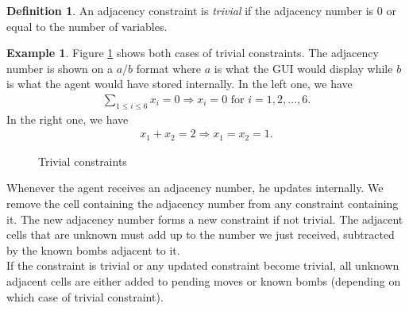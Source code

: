 \documentclass[11pt,a4paper,notitlepage]{article}
\theoremstyle{definition}
\newtheorem{example}{Example}[section]
\newtheorem{definition}{Definition}[section]
\begin{document}
\begin{definition}
An adjacency constraint is \emph{trivial} if the adjacency number is 0 or equal to the number of variables.
\end{definition}

\begin{example}
Figure \ref{fig:triv} shows both cases of trivial constraints. The adjacency number is shown on a $a/b$ format where $a$ is what the GUI would display while $b$ is what the agent would have stored internally. In the left one, we have 
\begin{align*}
\sum_{1 \leq i \leq 6}x_i = 0 \Rightarrow x_i = 0 \text{ for } i = 1,2,\ldots,6.
\end{align*}
In the right one, we have
\begin{align*}
x_1 + x_2 = 2 \Rightarrow x_1 = x_2 = 1.
\end{align*}
\begin{figure}[H]
\begin{center}
\hspace{2cm}
\end{center}
\caption{Trivial constraints}
\label{fig:triv}
\end{figure}
\end{example}

Whenever the agent receives an adjacency number, he updates internally. We remove the cell containing the adjacency number from any constraint containing it. The new adjacency number forms a new constraint if not trivial. The adjacent cells that are unknown must add up to the number we just received, subtracted by the known bombs adjacent to it.\\

If the constraint is trivial or any updated constraint become trivial, all unknown adjacent cells are either added to pending moves or known bombs (depending on which case of trivial constraint).\\
\end{document}
